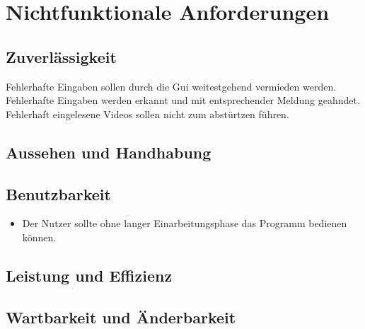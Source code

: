 \chapter{Nichtfunktionale Anforderungen}
\section{Zuverlässigkeit}
\setcounter{enumi}{0}
 Fehlerhafte Eingaben sollen durch die Gui weitestgehend vermieden werden.
 Fehlerhafte Eingaben werden erkannt und mit entsprechender Meldung geahndet.
 Fehlerhaft eingelesene Videos sollen nicht zum abstürtzen führen.
\section{Aussehen und Handhabung}
\section{Benutzbarkeit}
\begin{itemize}
\item Der Nutzer sollte ohne langer Einarbeitungsphase das Programm bedienen können.
\end{itemize}
\section{Leistung und Effizienz}
\section{Wartbarkeit und Änderbarkeit}
